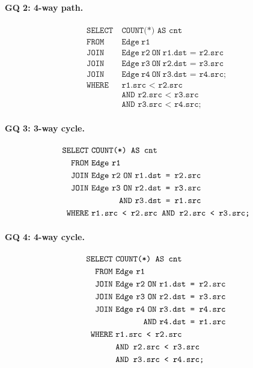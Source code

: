 \documentclass[sigconf]{acmart}
\begin{document}
\paragraph{GQ 2: 4-way path.}
\[
\begin{aligned}
\texttt{SELECT}\ &\texttt{COUNT(*) AS cnt}\\
\texttt{FROM}\ &\texttt{Edge}\ \texttt{r1}\\
\texttt{JOIN}\ &\texttt{Edge}\ \texttt{r2}\ \texttt{ON}\ \texttt{r1.dst = r2.src}\\
\texttt{JOIN}\ &\texttt{Edge}\ \texttt{r3}\ \texttt{ON}\ \texttt{r2.dst = r3.src}\\
\texttt{JOIN}\ &\texttt{Edge}\ \texttt{r4}\ \texttt{ON}\ \texttt{r3.dst = r4.src;}\\
\texttt{WHERE}\ &\texttt{r1.src < r2.src}\\
&\texttt{AND r2.src < r3.src}\\
&\texttt{AND r3.src < r4.src;}
\end{aligned}
\]



\paragraph{GQ 3: 3-way cycle.}
\[
\begin{aligned}
\texttt{SELECT}\ &\texttt{COUNT(*) AS cnt}\\
\texttt{FROM}\ &\texttt{Edge}\ \texttt{r1}\\
\texttt{JOIN}\ &\texttt{Edge}\ \texttt{r2}\ \texttt{ON}\ \texttt{r1.dst = r2.src}\\
\texttt{JOIN}\ &\texttt{Edge}\ \texttt{r3}\ \texttt{ON}\ \texttt{r2.dst = r3.src}\\
&\hspace{3.3em}\texttt{AND}\ \texttt{r3.dst = r1.src}\\
\texttt{WHERE}\ &\texttt{r1.src < r2.src AND r2.src < r3.src;}
\end{aligned}
\]

\paragraph{GQ 4: 4-way cycle.}
\[
\begin{aligned}
\texttt{SELECT}\ &\texttt{COUNT(*) AS cnt}\\
\texttt{FROM}\ &\texttt{Edge}\ \texttt{r1}\\
\texttt{JOIN}\ &\texttt{Edge}\ \texttt{r2}\ \texttt{ON}\ \texttt{r1.dst = r2.src}\\
\texttt{JOIN}\ &\texttt{Edge}\ \texttt{r3}\ \texttt{ON}\ \texttt{r2.dst = r3.src}\\
\texttt{JOIN}\ &\texttt{Edge}\ \texttt{r4}\ \texttt{ON}\ \texttt{r3.dst = r4.src}\\
&\hspace{3.3em}\texttt{AND}\ \texttt{r4.dst = r1.src}\\
\texttt{WHERE}\ &\texttt{r1.src < r2.src}\\
&\texttt{AND r2.src < r3.src}\\
&\texttt{AND r3.src < r4.src;}
\end{aligned}
\]
\end{document}
